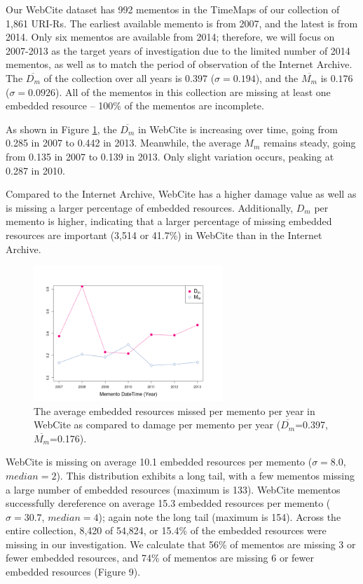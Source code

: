 Our WebCite dataset has 992 mementos in the TimeMaps of our collection of 1,861 URI-Rs. The earliest available memento is from 2007, and the latest is from 2014. Only six mementos are available from 2014; therefore, we will focus on 2007-2013 as the target years of investigation due to the limited number of 2014 mementos, as well as to match the period of observation of the Internet Archive. The $\overline{D_m}$ of the collection over all years is $0.397$ ($\sigma=0.194$), and the $\overline{M_m}$ is $0.176$ ($\sigma=0.0926$). All of the mementos in this collection are missing at least one embedded resource -- 100\% of the mementos are incomplete. 

As shown in Figure \ref{missingByYearWC}, the $\overline{D_m}$ in WebCite is increasing over time, going from 0.285 in 2007 to 0.442 in 2013. Meanwhile, the average $M_m$ remains steady, going from 0.135 in 2007 to 0.139 in 2013. Only slight variation occurs, peaking at 0.287 in 2010. 

Compared to the Internet Archive, WebCite has a higher damage value as well as is missing a larger percentage of embedded resources. Additionally, $D_m$ per memento is higher, indicating that a larger percentage of missing embedded resources are important (3,514 or 41.7\%) in WebCite than in the Internet Archive.

\begin{figure}[h!]
\includegraphics[width=270px]{./imgs/MissedAndDamagePerYear_webcite.png}
\caption{The average embedded resources missed per memento per year in WebCite as compared to damage per memento per year ($\overline{D_m}$=0.397, $\overline{M_m}$=0.176).}
\label{missingByYearWC}
\end{figure}

WebCite is missing on average 10.1 embedded resources per memento ($\sigma=8.0$, $median=2$). This distribution exhibits a long tail, with a few mementos missing a large number of embedded resources (maximum is 133). WebCite mementos successfully dereference on average 15.3 embedded resources per memento ($\sigma=30.7$, $median=4$); again note the long tail (maximum is 154). Across the entire collection, 8,420 of 54,824, or 15.4\% of the embedded resources were missing in our investigation. We calculate that 56\% of mementos are missing 3 or fewer embedded resources, and 74\% of mementos are missing 6 or fewer embedded resources (Figure 9).

